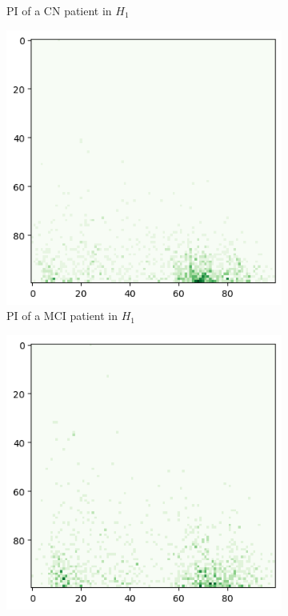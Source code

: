 \documentclass{article}
\begin{document}
\begin{figure}[htb]
\begin{subfigure}{0.32\textwidth}
    \caption{PI of a CN patient in $H_1$}
  \end{subfigure}
  \begin{subfigure}{0.32\textwidth}
    \includegraphics[width=\textwidth]{figures/representative_samples/Persistence_image_MCI_h_1.png}
    \caption{PI of a MCI patient in $H_1$}
  \end{subfigure}
  \begin{subfigure}{0.32\textwidth}
    \includegraphics[width=\textwidth]{figures/representative_samples/Persistence_image_AD_h_1.png}

\end{subfigure}
\end{figure}
\end{document}
